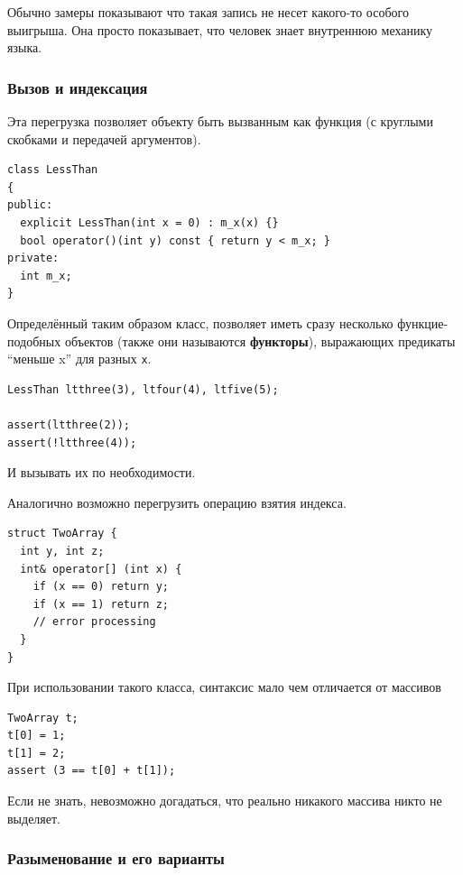 \documentclass[a4paper,12pt,oneside]{article}
\begin{document}
Обычно замеры показывают что такая запись не несет какого-то особого выигрыша. Она просто показывает, что человек знает внутреннюю механику языка.

\subsubsection{Вызов и индексация}\label{BracketOverloading}

Эта перегрузка позволяет объекту быть вызванным как функция (с круглыми скобками и передачей аргументов).

\begin{lstlisting}
class LessThan
{
public:
  explicit LessThan(int x = 0) : m_x(x) {}
  bool operator()(int y) const { return y < m_x; }
private:
  int m_x;
}
\end{lstlisting}

Определённый таким образом класс, позволяет иметь сразу несколько функцие-подобных объектов (также они называются \textbf{функторы}), выражающих предикаты ``меньше x'' для разных \lstinline!x!.

\begin{lstlisting}
LessThan ltthree(3), ltfour(4), ltfive(5);

assert(ltthree(2));
assert(!ltthree(4));
\end{lstlisting}

И вызывать их по необходимости.

Аналогично возможно перегрузить операцию взятия индекса.

\begin{lstlisting}
struct TwoArray {
  int y, int z;
  int& operator[] (int x) {
    if (x == 0) return y;
    if (x == 1) return z;
    // error processing
  }
}
\end{lstlisting}

При использовании такого класса, синтаксис мало чем отличается от массивов

\begin{lstlisting}
TwoArray t;
t[0] = 1;
t[1] = 2;
assert (3 == t[0] + t[1]);
\end{lstlisting}

Если не знать, невозможно догадаться, что реально никакого массива никто не выделяет.

\subsubsection{Разыменование и его варианты}\label{DereferenceOverloading}
\end{document}
